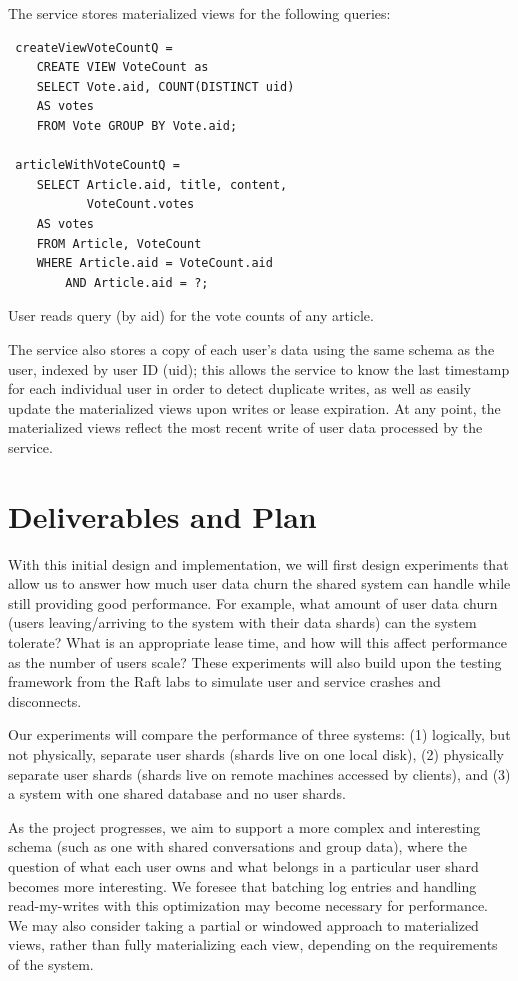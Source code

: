 \documentclass[letterpaper,twocolumn,10pt]{article}
\begin{document}
\noindent
The service stores materialized views for the following queries:
\begin{verbatim}
 createViewVoteCountQ = 
    CREATE VIEW VoteCount as 
    SELECT Vote.aid, COUNT(DISTINCT uid) 
    AS votes 
    FROM Vote GROUP BY Vote.aid;

 articleWithVoteCountQ = 
    SELECT Article.aid, title, content, 
           VoteCount.votes 
    AS votes 
    FROM Article, VoteCount 
    WHERE Article.aid = VoteCount.aid 
        AND Article.aid = ?;
\end{verbatim}
\noindent
User reads query (by aid) for the vote counts of any article.

The service also stores a copy of each user's data using the same schema as the user, indexed by user ID (uid); 
this allows the service to know the last timestamp for each individual user in order to detect 
duplicate writes, as well as easily update the materialized views upon writes or lease expiration. 
At any point, the materialized views reflect the most recent write of user data processed by the service.

\section{Deliverables and Plan}

With this initial design and implementation, we will first design experiments that 
allow us to answer how much user data churn the shared system can handle while still providing good
performance. For example, what amount of user data churn (users leaving/arriving to the system with their data shards) can the system tolerate? What is an appropriate lease time, and how will this affect performance as the number of users scale?
These experiments will also build upon the testing framework from the Raft labs to simulate user and service crashes and disconnects.

Our experiments will compare the performance of three systems: (1) logically, but not physically, separate user shards (shards live on one local disk), (2) physically separate user shards (shards live on remote machines accessed by clients), and (3) a system with one shared database and no user shards.

As the project progresses, we aim to support a more complex and interesting schema (such as one with shared conversations and group data), where the question of what each user owns and what belongs in a particular user shard becomes more interesting.
We foresee that batching log entries and handling read-my-writes with this optimization may become necessary for performance.
We may also consider taking a partial or windowed approach to materialized views, rather than fully materializing each view, depending on the requirements of the system.
\end{document}
